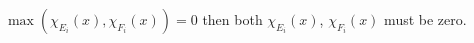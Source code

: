 \documentclass[preview]{standalone}
\begin{document}
\begin{center}
$\max(\chi_{E_i}(x),\chi_{F_i}(x))=0$ then both $\chi_{E_i}(x)$, $\chi_{F_i}(x)$ must be zero.
\end{center}
\end{document}
